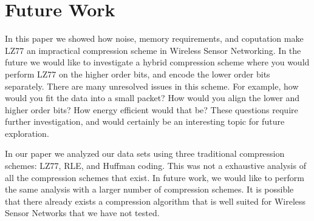 \section{Future Work}

In this paper we showed how noise, memory requirements, and coputation
make LZ77 an impractical compression scheme in Wireless Sensor
Networking. In the future we would like to investigate a hybrid
compression scheme where you would perform LZ77 on the higher order
bits, and encode the lower order bits separately. There are many
unresolved issues in this scheme. For example, how would you fit the
data into a small packet? How would you align the lower and higher
order bits? How energy efficient would that be?  These questions
require further investigation, and would certainly be an interesting
topic for future exploration.

In our paper we analyzed our data sets using three traditional
compression schemes: LZ77, RLE, and Huffman coding. This was not a
exhaustive analysis of all the compression schemes that exist. In
future work, we would like to perform the same analysis with a larger
number of compression schemes. It is possible that there already
exists a compression algorithm that is well suited for Wireless Sensor
Networks that we have not tested. 

 
